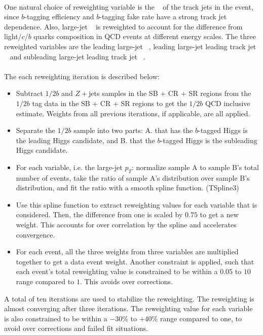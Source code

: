 \paragraph{}
One natural choice of reweighting variable is the \pt~ of the track jets in the event, since $b$-tagging efficiency and $b$-tagging fake rate have a strong track jet \pt~ dependence. 
Also, large-\R jet \pt~ is reweighted to account for the difference from light/$c$/$b$ quarks composition in QCD events at different energy scales.
The three reweighted variables are the leading large-\R jet \pt~, leading large-\R jet leading track jet \pt~ and subleading large-\R jet leading track jet \pt~.

\paragraph{}
The each reweighting iteration is described below:
\begin{itemize}
\item Subtract $1/2b$ \ttbar and $Z+$jets samples in the SB + CR + SR regions from the $1/2b$ tag data in the SB + CR + SR regions to get the $1/2b$ QCD inclusive estimate. Weights from all previous iterations, if applicable, are all applied.
\item Separate the $1/2b$ sample into two parts: A. that has the $b$-tagged Higgs is the leading \pt Higgs candidate, and B. that the $b$-tagged Higgs is the subleading \pt Higgs candidate.
\item For each variable, i.e. the large-\R jet $p_{T}$: normalize sample A to sample B's total number of events, take the ratio of sample A's distribution over sample B's distribution, and fit the ratio with a smooth spline function. (TSpline3)
\item Use this spline function to extract reweighting values for each variable that is considered. Then, the difference from one is scaled by $0.75$ to get a new weight. This accounts for over correlation by the spline and accelerates convergence.
\item For each event, all the three weights from three variables are multiplied together to get a data event weight. Another constraint is applied, such that each event's total reweighting value is constrained to be within a $0.05$ to $10$ range compared to $1$. This avoids over corrections.
\end{itemize}
A total of ten iterations are used to stabilize the reweighting. 
The reweighting is almost converging after three iterations.
The reweighting value for each variable is also constrained to be within a $-30\%$ to $+40\%$ range compared to one, to avoid over corrections and failed fit situations.

